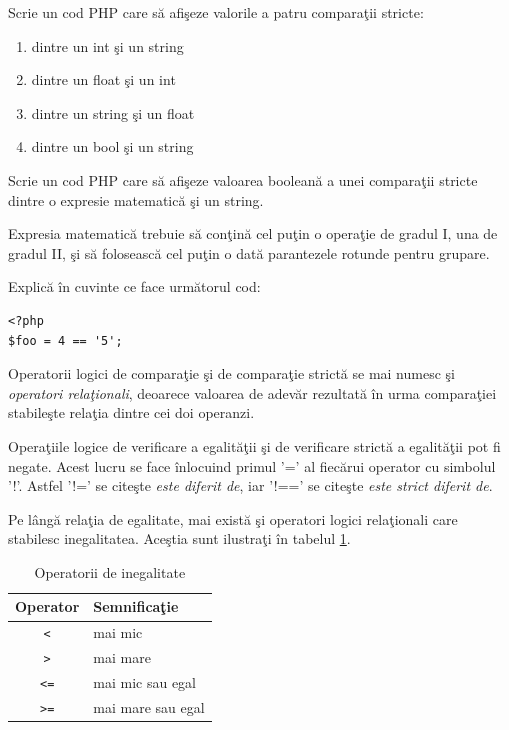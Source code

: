 \begin{Exercise}[title={Verifică-ţi puterea de a face analogii},difficulty=1]
Scrie un cod PHP care să afişeze valorile a patru comparaţii stricte:
\begin{enumerate}
	\item dintre un int şi un string
	\item dintre un float şi un int
	\item dintre un string şi un float
	\item dintre un bool şi un string
\end{enumerate}
\end{Exercise}

\begin{Exercise}[title={Am sintetizat corect noţiunea de \textit{expresie}?},difficulty=2]
\ExePart
Scrie un cod PHP care să afişeze valoarea booleană a unei comparaţii
stricte dintre o expresie matematică şi un string.

Expresia matematică trebuie să conţină cel puţin o operaţie de gradul I, una
de gradul II, şi să folosească cel puţin o dată parantezele rotunde pentru
grupare.
\ExePart

Explică în cuvinte ce face următorul cod:

\begin{lstlisting}
<?php
$foo = 4 == '5';
\end{lstlisting}
\end{Exercise}

Operatorii logici de comparaţie şi de comparaţie strictă se mai numesc
şi \textsl{operatori relaţionali}, deoarece valoarea de adevăr rezultată
în urma comparaţiei stabileşte relaţia dintre cei doi operanzi.

Operaţiile logice de verificare a egalităţii şi de verificare strictă
a egalităţii pot fi negate. Acest lucru se face înlocuind primul '='
al fiecărui operator cu simbolul '!'. Astfel '!=' se citeşte \textit{este diferit de},
iar '!==' se citeşte \textit{este strict diferit de}.

Pe lângă relaţia de egalitate, mai există şi operatori logici relaţionali
care stabilesc inegalitatea. Aceştia sunt ilustraţi în
tabelul \ref{tbl:operatori inegalitate}.

\begin{table}[ht!]
  \begin{center}
  	  \begin{tabular}{| c | l |}
	  \hline
	  Operator & Semnificaţie \\
	  \hline
	  \texttt{<}	& mai mic \\
	  \texttt{>}	& mai mare \\
	  \texttt{<=}	& mai mic sau egal \\
	  \texttt{>=}	& mai mare sau egal \\
	  \hline
	  \end{tabular}
  \end{center}
  \caption{Operatorii de inegalitate}
  \label{tbl:operatori inegalitate}
\end{table}


